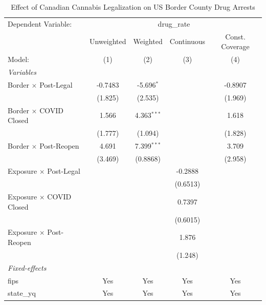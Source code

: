 
\begin{table}[htbp]
   \caption{\label{tab:main} Effect of Canadian Cannabis Legalization on US Border County Drug Arrests}
   \centering
   \begin{tabular}{lcccc}
      \tabularnewline \midrule \midrule
      Dependent Variable: & \multicolumn{4}{c}{drug\_rate}\\
                                      & Unweighted & Weighted      & Continuous & Const. Coverage \\   
      Model:                          & (1)        & (2)           & (3)        & (4)\\  
      \midrule
      \emph{Variables}\\
      Border $\times$ Post-Legal      & -0.7483    & -5.696$^{*}$  &            & -0.8907\\   
                                      & (1.825)    & (2.535)       &            & (1.969)\\   
      Border $\times$ COVID Closed    & 1.566      & 4.363$^{***}$ &            & 1.618\\   
                                      & (1.777)    & (1.094)       &            & (1.828)\\   
      Border $\times$ Post-Reopen     & 4.691      & 7.399$^{***}$ &            & 3.709\\   
                                      & (3.469)    & (0.8868)      &            & (2.958)\\   
      Exposure $\times$ Post-Legal    &            &               & -0.2888    &   \\   
                                      &            &               & (0.6513)   &   \\   
      Exposure $\times$ COVID Closed  &            &               & 0.7397     &   \\   
                                      &            &               & (0.6015)   &   \\   
      Exposure $\times$ Post-Reopen   &            &               & 1.876      &   \\   
                                      &            &               & (1.248)    &   \\   
      \midrule
      \emph{Fixed-effects}\\
      fips                            & Yes        & Yes           & Yes        & Yes\\  
      state\_yq                       & Yes        & Yes           & Yes        & Yes\\  

\end{tabular}
\end{table}
